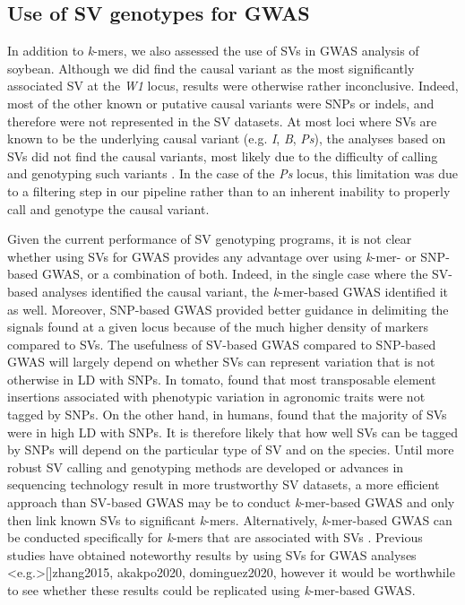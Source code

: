 \documentclass{article}
\begin{document}
\subsection*{Use of SV genotypes for GWAS}

In addition to \emph{k}-mers, we also assessed the use of SVs in GWAS analysis
of soybean.  Although we did find the causal variant as the most significantly
associated SV at the \emph{W1} locus, results were otherwise rather
inconclusive.  Indeed, most of the other known or putative causal variants were
SNPs or indels, and therefore were not represented in the SV datasets. At most
loci where SVs are known to be the underlying causal variant (e.g.  \emph{I},
\emph{B}, \emph{Ps}), the analyses based on SVs did not find the causal
variants, most likely due to the difficulty of calling and genotyping such
variants . In the case of the \textit{Ps} locus,
this limitation was due to a filtering step in our pipeline rather than to an
inherent inability to properly call and genotype the causal variant.

Given the current performance of SV genotyping programs, it is not clear
whether using SVs for GWAS provides any advantage over using \emph{k}-mer- or
SNP-based GWAS, or a combination of both.  Indeed, in the single case where the
SV-based analyses identified the causal variant, the \emph{k}-mer-based GWAS
identified it as well. Moreover, SNP-based GWAS provided better guidance
in delimiting the signals found at a given locus because of the much higher
density of markers compared to SVs.  The usefulness of SV-based GWAS compared
to SNP-based GWAS will largely depend on whether SVs can represent variation
that is not otherwise in LD with SNPs. In tomato,  found
that most transposable element insertions associated with phenotypic variation
in agronomic traits were not tagged by SNPs. On the other hand, in humans,
 found that the majority of SVs were in high LD with SNPs. It
is therefore likely that how well SVs can be tagged by SNPs will depend on the
particular type of SV and on the species. Until more robust SV calling and genotyping
methods are developed or advances in sequencing technology result in more
trustworthy SV datasets, a more efficient approach than
SV-based GWAS may be to conduct \emph{k}-mer-based GWAS and only then link
known SVs to significant \emph{k}-mers.  Alternatively, \textit{k}-mer-based
GWAS can be conducted specifically for \textit{k}-mers that are associated with
SVs .  Previous studies have obtained noteworthy results by
using SVs for GWAS analyses \shortcite<e.g.>[]{zhang2015, akakpo2020,
dominguez2020}, however it would be worthwhile to see whether these results
could be replicated using \emph{k}-mer-based GWAS.
\end{document}
